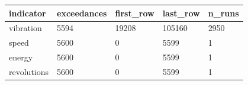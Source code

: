 \begin{tabular}{lllll}
\toprule
indicator & exceedances & first\_row & last\_row & n\_runs \\
\midrule
vibration & 5594 & 19208 & 105160 & 2950 \\
speed & 5600 & 0 & 5599 & 1 \\
energy & 5600 & 0 & 5599 & 1 \\
revolutions & 5600 & 0 & 5599 & 1 \\
\bottomrule
\end{tabular}
